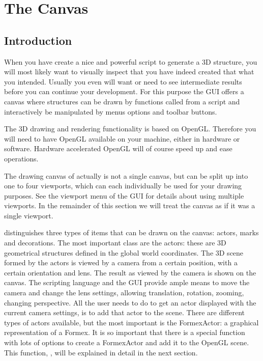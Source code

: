 
\chapter{The Canvas}
\label{cha:canvas}

\section{Introduction}
When you have create a nice and powerful script to generate a 3D structure, you will most likely want to visually inspect that you have indeed created that what you intended. Usually you even will want or need to see intermediate results before you can continue your development. 
For this purpose the \pyformex GUI offers a canvas where structures can be drawn by functions called from a script and interactively be manipulated by menus options and toolbar buttons.

The 3D drawing and rendering functionality is based on OpenGL. Therefore you will need to have OpenGL available on your machine, either in hardware or software. Hardware accelerated OpenGL will of course speed up and ease operations.

The drawing canvas of \pyformex actually is not a single canvas, but can be split up into one to four viewports, which can each individually be used for your drawing purposes. See the viewport menu of the GUI for details about using multiple viewports. In the remainder of this section we will treat the canvas as if it was a single viewport.

\pyformex distinguishes three types of items that can be drawn on the canvas: actors, marks and decorations. The most important class are the actors: these are 3D geometrical structures defined in the global world coordinates. The 3D scene formed by the actors is viewed by a camera from a certain position, with a certain orientation and lens. The result as viewed by the camera is shown on the canvas. The \pyformex scripting language and the GUI provide ample means to move the camera and change the lens settings, allowing translation, rotation, zooming, changing perspective. All the user needs to do to get an actor displayed with the current camera settings, is to add that actor to the scene. There are different types of actors available, but the most important is the FormexActor: a graphical representation of a Formex. It is so important that there is a special function with lots of options to create a FormexActor and add it to the OpenGL scene.
This function, , will be explained in detail in the next section.

